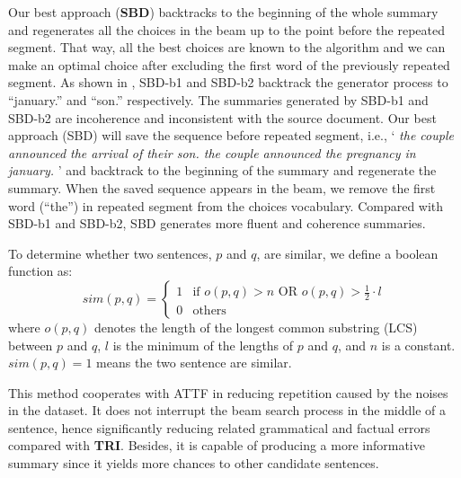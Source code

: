 Our best approach (\textbf{SBD}) backtracks to the beginning of the whole summary
and regenerates all the choices in the beam up to the point before
the repeated segment. That way, all the best choices are known to the
algorithm and we can make an optimal choice after excluding the first word
of the previously repeated segment. 
As shown in ,
SBD-b1 and SBD-b2 backtrack the generator process
to ``january.'' and ``son.'' respectively.
The summaries generated by SBD-b1 and SBD-b2 
are incoherence and inconsistent with the source document.
Our best approach (SBD) will save the sequence before repeated segment, i.e., 
`\textit{
the couple announced the arrival of their son.
the couple announced the pregnancy in january.}
'
and backtrack to the beginning of the summary and regenerate the summary. 
When the saved sequence appears in the beam, we remove the first word (``the'') in 
repeated segment from the choices vocabulary. 
Compared with SBD-b1 and SBD-b2, SBD generates more fluent and coherence summaries.


To determine whether two sentences, 
$p$ and $q$, are similar, we define a boolean function as:
\begin{equation}\label{eq:s}
	sim(p,q) = 
	\begin{cases}
		   1 &\mbox{if $o(p,q) > n\text{ OR }o(p,q) > \frac{1}{2}\cdot l$}\\
		   0 &\mbox{others}
   \end{cases}
\end{equation}
where $o(p,q)$ denotes the length of 
the longest common substring (LCS) between $p$ and $q$, 
$l$ is the minimum of the lengths of $p$ and $q$, and $n$ is a constant. 
$sim(p,q)=1$ means the two sentence are similar.

This method cooperates with ATTF in 
reducing repetition caused by the noises in the dataset.
It does not interrupt the beam search process in the middle of a sentence, 
hence significantly reducing related grammatical and factual errors 
compared with \textbf{TRI}.
Besides, it is capable of producing a more informative summary since
it yields more chances to other candidate sentences.
